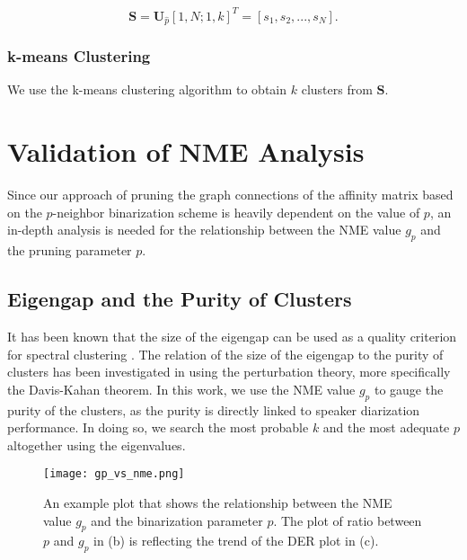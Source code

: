 \documentclass[journal]{IEEEtran}
\begin{document}
     \begin{equation} 
        \mathbf{S}= \mathbf{U}_{\hat{p}}[1,N;1,k]^{T} = [s_{1}, s_{2},...,s_{N}].
    \end{equation}
    \subsubsection{k-means Clustering} We use the k-means clustering algorithm \cite{lloyd1982least} to obtain $k$ clusters from $\mathbf{S}$.
\vspace{-0ex}
\section{Validation of NME Analysis}
Since our approach of pruning the graph connections of the affinity matrix based on the $p$-neighbor binarization scheme is heavily dependent on the value of $p$, an in-depth analysis is needed for the relationship between the NME value $g_p$ and the pruning parameter $p$.
\vspace{-2ex}
\subsection{Eigengap and the Purity of Clusters}
 It has been known that the size of the eigengap can be used as a quality criterion for spectral clustering \cite{von2007tutorial}. The relation of the size of the eigengap to the purity of clusters has been investigated in \cite{von2007tutorial, stewart1990matrix} using the perturbation theory, more specifically the Davis-Kahan theorem. In this work, we use the NME value $g_p$ to gauge the purity of the clusters, as the purity is directly linked to speaker diarization performance. In doing so, we search the most probable $k$ and the most adequate $p$ altogether using the eigenvalues.
\vspace{-1.0ex}
\begin{figure}[t]
\label{fig:gp_vs_nme}
\vspace{-0.0ex}
\centerline{\texttt{[image: gp\_vs\_nme.png]}}
\vspace{-1.5ex}
\caption{An example plot that shows the relationship between the NME value $g_p$ and the binarization parameter $p$. The plot of ratio between $p$ and $g_p$ in (b) is reflecting the trend of the DER plot in (c).}
\end{figure}
\end{document}
